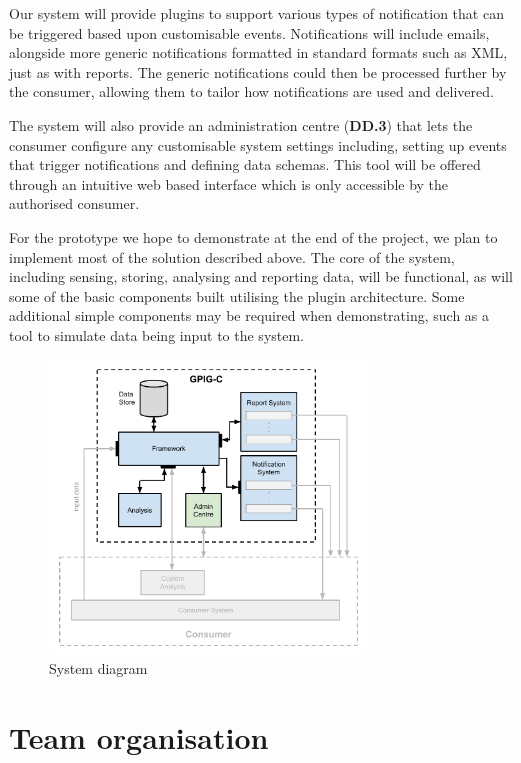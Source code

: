 \documentclass[10pt,a4paper]{article}
\begin{document}
Our system will provide plugins to support various types of notification that
can be triggered based upon customisable events. Notifications will include 
emails, alongside more generic notifications formatted in standard formats such
as XML, just as with reports. The generic notifications could then be processed
further by the consumer, allowing them to tailor how notifications are used and
delivered.

The system will also provide an administration centre (\textbf{DD.3}) that lets
the consumer configure any customisable system settings including, setting up
events that trigger notifications and defining data schemas. This tool will be
offered through an intuitive web based interface which is only accessible by the
authorised consumer.

For the prototype we hope to demonstrate at the end of the project, we plan to
implement most of the solution described above. The core of the system,
including sensing, storing, analysing and reporting data, will be functional,
as will some of the basic components built utilising the plugin architecture.
Some additional simple components may be required when demonstrating, such as a
tool to simulate data being input to the system. 



\begin{figure}[hptb]
	\centering
	\includegraphics[width=0.75\textwidth]{system-architecture.pdf}
	\caption{System diagram}
\end{figure}


\section{Team organisation}
\end{document}
